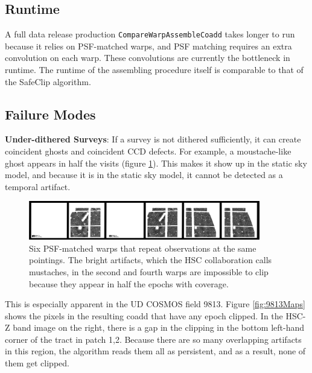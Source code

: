 \documentclass[DM,authoryear,toc]{lsstdoc}
\begin{document}
\subsection{Runtime}
A full data release  production \texttt{CompareWarpAssembleCoadd} takes longer to run because it relies on PSF-matched warps, and PSF matching requires an extra convolution on each warp.
These convolutions are currently the bottleneck in runtime.
The runtime of the assembling procedure itself is comparable to that of the SafeClip algorithm.

\subsection{Failure Modes}

\textbf{Under-dithered Surveys}: If a survey is not dithered sufficiently, it can create coincident ghosts and coincident CCD defects.
For example, a moustache-like ghost appears in half the visits (figure \ref{fig:underdithered}).
This makes it show up in the static sky model, and because it is in the static sky model, it cannot be detected as a temporal artifact.

\begin{figure}
\begin{centering}
\includegraphics[width=0.9\textwidth]{figures/underdithered.png}
\par\end{centering}
\caption{\label{fig:underdithered} Six PSF-matched warps that repeat observations at the same pointings. The bright artifacts, which the HSC collaboration calls mustaches, in the second and fourth warps are impossible to clip because they appear in half the epochs with coverage.}
\end{figure}

This is especially apparent in the UD COSMOS field 9813.
Figure \ref{fig:9813Maps} shows the pixels in the resulting coadd that have any epoch clipped.
In the HSC-Z band image on the right,  there is a gap in the clipping in the bottom left-hand corner of the tract in patch 1,2.
Because there are so many overlapping artifacts in this region,  the algorithm reads them all as persistent, and as a result, none of them get clipped.
\end{document}
